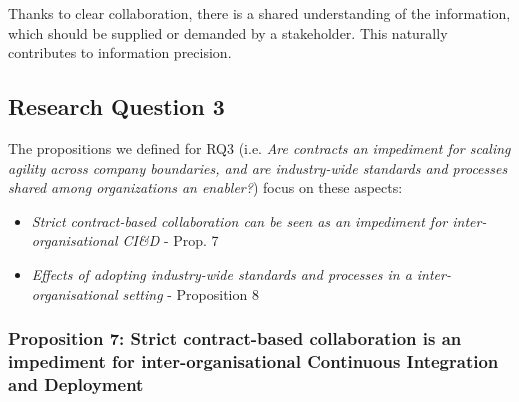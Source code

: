  Thanks to clear collaboration, there is a shared understanding of the information, which should be supplied or demanded by a stakeholder. This naturally contributes to information precision.

\subsection{Research Question 3}\label{sec:ResearchQuestion3}

The propositions we defined for  
RQ3 (i.e. {\em Are contracts an impediment for scaling agility across company boundaries, and 
are industry-wide standards and processes shared among organizations an enabler?}) focus on these aspects:

\begin{itemize}
\item {\em Strict contract-based collaboration can be seen as an impediment for inter-organisational CI\&D}  - Prop. 7 
\item {\em Effects of adopting industry-wide standards and processes in a inter-organisational setting} - Proposition 8 
\end{itemize}

\vspace{.2cm}
\subsubsection{Proposition 7: Strict contract-based collaboration is an impediment for inter-organisational Continuous Integration and Deployment}

